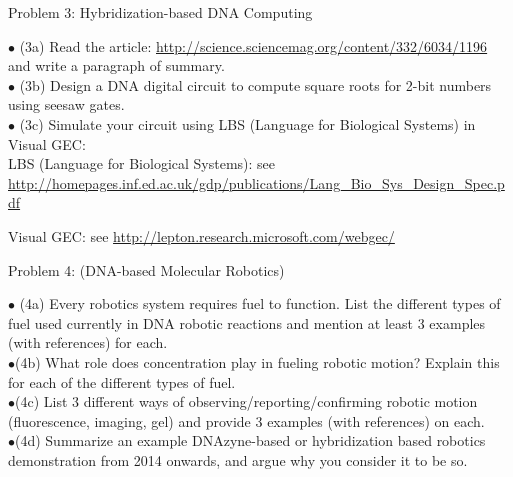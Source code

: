 \documentclass{article}
\begin{document}
\newpage
\centerline{\sc Problem 3:  Hybridization-based DNA Computing}
\vspace{0.2in}
$\bullet$ (3a) Read the article: \url{ http://science.sciencemag.org/content/332/6034/1196} and write a paragraph of summary.\\ 


$\bullet$ (3b) Design a DNA digital circuit to compute square roots for 2-bit numbers using seesaw gates. \\


$\bullet$ (3c) Simulate your circuit using LBS (Language for Biological Systems) in Visual GEC: \\

LBS (Language for Biological Systems): see  
	\url{ http://homepages.inf.ed.ac.uk/gdp/publications/Lang_Bio_Sys_Design_Spec.pdf }
	
	Visual GEC: see \url{ http://lepton.research.microsoft.com/webgec/ }





\newpage
\centerline{\sc Problem 4:   (DNA-based Molecular Robotics)}
\vspace{0.2in}
$\bullet$ (4a) Every robotics system requires fuel to function. List the different types of fuel used currently in DNA robotic reactions and mention at least 3 examples (with references) for each. \\

$\bullet$(4b) What role does concentration play in fueling robotic motion? Explain this for each of the different types of fuel.  \\

$\bullet$(4c) List 3 different ways of observing/reporting/confirming robotic motion (fluorescence, imaging, gel) and provide 3 examples (with references) on each.  \\

$\bullet$(4d) Summarize an example DNAzyne-based or hybridization based robotics demonstration from 2014 onwards, and argue why you consider it to be so.
\end{document}

